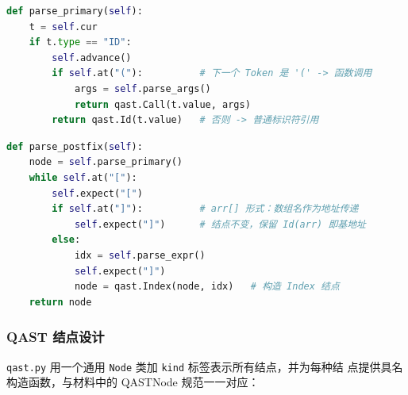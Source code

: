 \documentclass[12pt,a4paper]{ctexart}
\begin{document}
\begin{lstlisting}[language=Python, caption={标识符后的分叉：变量引用 vs. 函数调用}]
def parse_primary(self):
    t = self.cur
    if t.type == "ID":
        self.advance()
        if self.at("("):          # 下一个 Token 是 '(' -> 函数调用
            args = self.parse_args()
            return qast.Call(t.value, args)
        return qast.Id(t.value)   # 否则 -> 普通标识符引用
\end{lstlisting}

\begin{lstlisting}[language=Python, caption={数组下标与"退化"传参形式 arr[] 的处理}]
def parse_postfix(self):
    node = self.parse_primary()
    while self.at("["):
        self.expect("[")
        if self.at("]"):          # arr[] 形式：数组名作为地址传递
            self.expect("]")      # 结点不变，保留 Id(arr) 即基地址
        else:
            idx = self.parse_expr()
            self.expect("]")
            node = qast.Index(node, idx)   # 构造 Index 结点
    return node
\end{lstlisting}

\subsubsection{QAST 结点设计}

\texttt{qast.py} 用一个通用 \texttt{Node} 类加 \texttt{kind} 标签表示所有结点，并为每种结
点提供具名构造函数，与材料中的 QASTNode 规范一一对应：
\end{document}

